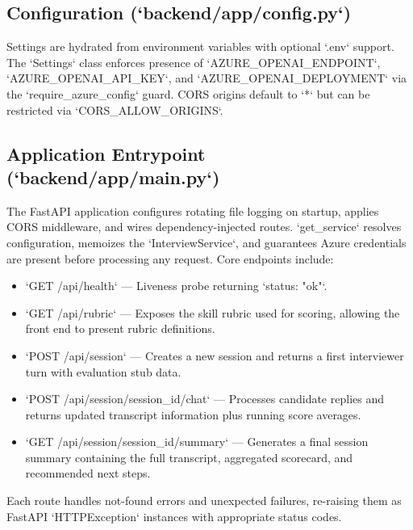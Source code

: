 \documentclass[11pt]{article}
\begin{document}
\subsection{Configuration (`backend/app/config.py`)}
Settings are hydrated from environment variables with optional `.env` support. The `Settings` class enforces presence of `AZURE_OPENAI_ENDPOINT`, `AZURE_OPENAI_API_KEY`, and `AZURE_OPENAI_DEPLOYMENT` via the `require_azure_config` guard. CORS origins default to `*` but can be restricted via `CORS_ALLOW_ORIGINS`.

\subsection{Application Entrypoint (`backend/app/main.py`)}
The FastAPI application configures rotating file logging on startup, applies CORS middleware, and wires dependency-injected routes. `get_service` resolves configuration, memoizes the `InterviewService`, and guarantees Azure credentials are present before processing any request. Core endpoints include:
\begin{itemize}[leftmargin=*]
  \item `GET /api/health` --- Liveness probe returning `{status: "ok"}`.
  \item `GET /api/rubric` --- Exposes the skill rubric used for scoring, allowing the front end to present rubric definitions.
  \item `POST /api/session` --- Creates a new session and returns a first interviewer turn with evaluation stub data.
  \item `POST /api/session/{session\_id}/chat` --- Processes candidate replies and returns updated transcript information plus running score averages.
  \item `GET /api/session/{session\_id}/summary` --- Generates a final session summary containing the full transcript, aggregated scorecard, and recommended next steps.
\end{itemize}
Each route handles not-found errors and unexpected failures, re-raising them as FastAPI `HTTPException` instances with appropriate status codes.
\end{document}
